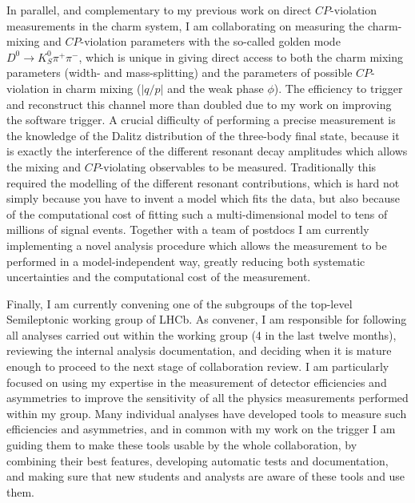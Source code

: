 \documentclass[12pt,a4paper,sans]{moderncv}
\begin{document}
In parallel, and complementary to my previous work on direct $C\!P$-violation measurements
in the charm system, I am collaborating on measuring the charm-mixing and $C\!P$-violation parameters 
with the so-called golden mode $D^0 \rightarrow K_S^0 \pi^+\pi^-$, which is unique in giving direct access to both the
charm mixing parameters (width- and mass-splitting) and the parameters of possible $C\!P$-violation in charm mixing ($|q/p|$ and the 
weak phase $\phi$). The efficiency
to trigger and reconstruct this channel more than doubled due to my work on improving the software trigger.
A crucial difficulty of performing a precise measurement is the knowledge of the Dalitz distribution of the three-body final state,
because it is exactly the interference of the different resonant decay amplitudes which allows the mixing and $C\!P$-violating
observables to be measured. Traditionally this required the modelling of the different resonant contributions, 
which is hard not simply because you have to invent a model which fits the data, but also because of the computational cost of fitting such a multi-dimensional
model to tens of millions of signal events.
Together with a team of postdocs I am currently implementing a novel analysis procedure which allows the measurement to be performed in a model-independent
way, greatly reducing both systematic uncertainties and the computational cost of the measurement.

Finally, I am currently convening one of the subgroups of the top-level Semileptonic working group of LHCb.
As convener, I am responsible for following all analyses carried out within the working group (4 in the last twelve months),
reviewing the internal analysis documentation, and deciding when it is mature enough 
to proceed to the next stage of collaboration review. 
I am particularly focused on using my expertise in the measurement 
of detector efficiencies and asymmetries
to improve the sensitivity of all the physics measurements performed within my group. 
Many individual analyses have developed tools to measure such efficiencies and asymmetries,
and in common with my work on the trigger I am guiding them to make these tools usable by the whole collaboration,
by combining their best features, developing automatic tests and documentation, and making sure that new students
and analysts are aware of these tools and use them.
\end{document}
